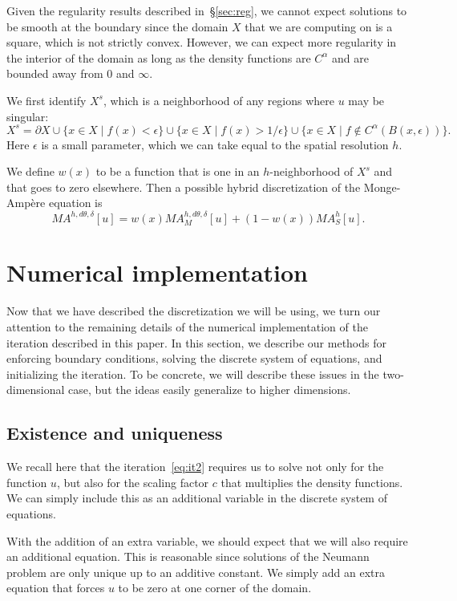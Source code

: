 \documentclass{amsart}
\theoremstyle{lemma}
\theoremstyle{remark}
\begin{document}
Given the regularity results described in~\S\ref{sec:reg}, we cannot expect solutions to be smooth at the boundary since the domain $X$ that we are computing on is a square, which is not strictly convex.  However, we can expect more regularity in the interior of the domain as long as the density functions are $C^\alpha$ and are bounded away from 0 and $\infty$.

We first identify $X^s$, which is a neighborhood of any regions where $u$ may be singular:
\[
X^s = 
\partial X \cup
\{ x \in X \mid  f(x)<\epsilon  \}  
\cup
\{ x \in X \mid  f(x)>1/\epsilon  \} 
\cup  
\{ x \in  X \mid f \notin C^\alpha(B(x,\epsilon)) \}.
\]
Here $\epsilon$ is a small parameter, which we can take equal to the spatial resolution $h$.

We define $w(x)$ to be a function that is one in an $h$-neighborhood of $X^s$ and that goes to zero elsewhere.  Then a possible hybrid discretization of the {{Monge-Amp\`ere}\xspace} equation is
\begin{equation}\label{eq:discHybrid}
MA^{h,d\theta,\delta}[u] = w(x)MA_M^{h,d\theta,\delta}[u] + (1-w(x)) MA_S^h[u].
\end{equation}

\section{Numerical implementation}\label{sec:implementation}
Now that we have described the discretization we will be using, we turn our attention to the remaining details of the numerical implementation of the iteration described in this paper.  In this section, we describe our methods for enforcing boundary conditions, solving the discrete system of equations, and initializing the iteration.  To be concrete, we will describe these issues in the two-dimensional case, but the ideas easily generalize to higher dimensions.

\subsection{Existence and uniqueness}\label{sec:discExist}
We recall here that the iteration~\eqref{eq:it2} requires us to solve not only for the function $u$, but also for the scaling factor $c$ that multiplies the density functions. We can simply include this as an additional variable in the discrete system of equations.

With the addition of an extra variable, we should expect that we will also require an additional equation.  This is reasonable since solutions of the Neumann problem are only unique up to an additive constant.  We simply add an extra equation that forces $u$ to be zero at one corner of the domain. 
\end{document}
